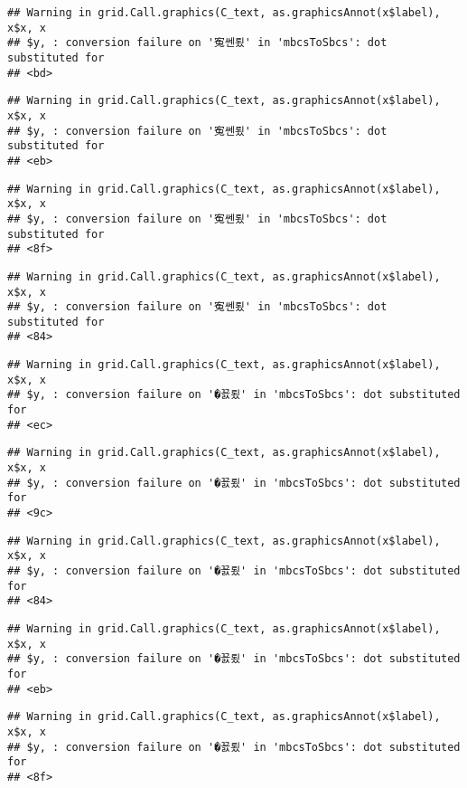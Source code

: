 \documentclass[]{article}
\begin{document}
\begin{verbatim}
## Warning in grid.Call.graphics(C_text, as.graphicsAnnot(x$label), x$x, x
## $y, : conversion failure on '寃쎈룄' in 'mbcsToSbcs': dot substituted for
## <bd>
\end{verbatim}

\begin{verbatim}
## Warning in grid.Call.graphics(C_text, as.graphicsAnnot(x$label), x$x, x
## $y, : conversion failure on '寃쎈룄' in 'mbcsToSbcs': dot substituted for
## <eb>
\end{verbatim}

\begin{verbatim}
## Warning in grid.Call.graphics(C_text, as.graphicsAnnot(x$label), x$x, x
## $y, : conversion failure on '寃쎈룄' in 'mbcsToSbcs': dot substituted for
## <8f>
\end{verbatim}

\begin{verbatim}
## Warning in grid.Call.graphics(C_text, as.graphicsAnnot(x$label), x$x, x
## $y, : conversion failure on '寃쎈룄' in 'mbcsToSbcs': dot substituted for
## <84>
\end{verbatim}

\begin{verbatim}
## Warning in grid.Call.graphics(C_text, as.graphicsAnnot(x$label), x$x, x
## $y, : conversion failure on '�꾨룄' in 'mbcsToSbcs': dot substituted for
## <ec>
\end{verbatim}

\begin{verbatim}
## Warning in grid.Call.graphics(C_text, as.graphicsAnnot(x$label), x$x, x
## $y, : conversion failure on '�꾨룄' in 'mbcsToSbcs': dot substituted for
## <9c>
\end{verbatim}

\begin{verbatim}
## Warning in grid.Call.graphics(C_text, as.graphicsAnnot(x$label), x$x, x
## $y, : conversion failure on '�꾨룄' in 'mbcsToSbcs': dot substituted for
## <84>
\end{verbatim}

\begin{verbatim}
## Warning in grid.Call.graphics(C_text, as.graphicsAnnot(x$label), x$x, x
## $y, : conversion failure on '�꾨룄' in 'mbcsToSbcs': dot substituted for
## <eb>
\end{verbatim}

\begin{verbatim}
## Warning in grid.Call.graphics(C_text, as.graphicsAnnot(x$label), x$x, x
## $y, : conversion failure on '�꾨룄' in 'mbcsToSbcs': dot substituted for
## <8f>
\end{verbatim}
\end{document}
